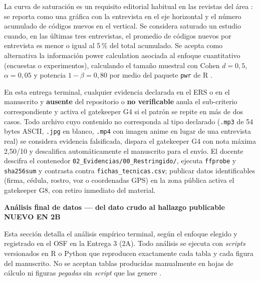 \documentclass[11pt,a4paper]{article}
\newcounter{secc}
\newcommand{\secband}[1]{%
    \stepcounter{secc}\par\vspace{9pt}\noindent
    {\setlength{\fboxsep}{0pt}%
        \colorbox{uteqgold}{\parbox[c][20pt][c]{0.05\textwidth}{\centering\textbf{\color{white}\small \arabic{secc}}}}%
        \colorbox{uteqgreen}{\parbox[c][20pt][c]{0.95\textwidth}{\hspace{8pt}\textbf{\color{white}\small #1}}}%
    }\par\vspace{5pt}}
\newcommand{\bF}{{\setlength{\fboxsep}{1.5pt}\colorbox{crimsonfin}{\scriptsize\bfseries\color{white}NUEVO EN 2B}}}
\begin{document}
\begin{notabox}[title=Sobre el punto de saturación y su reporte editorial]
    La curva de saturación es un requisito editorial habitual en las revistas del área \cite{hennink2017saturation,mendez2017naming}: se reporta como una gráfica con la entrevista en el eje horizontal y el número acumulado de códigos nuevos en el vertical.
    Se considera saturado un estudio cuando, en las últimas tres entrevistas, el promedio de códigos nuevos por entrevista es menor o igual al 5\,\% del total acumulado.
    Se acepta como alternativa la información power calculation asociada al enfoque cuantitativo (encuestas o experimentos), calculando el tamaño muestral con Cohen $d=0{,}5$, $\alpha=0{,}05$ y potencia $1-\beta=0{,}80$ por medio del paquete \texttt{pwr} de R \cite{cohen1988statpwr,champely2020pwr}.
\end{notabox}

\begin{alertbox}[title=Regla estricta de evidencias --- terminal]
    En esta entrega terminal, cualquier evidencia declarada en el ERS o en el manuscrito y \textbf{ausente} del repositorio o \textbf{no verificable} anula el sub-criterio correspondiente y activa el gatekeeper G4 si el patrón se repite en más de dos casos.
    Todo archivo cuyo contenido no corresponda al tipo declarado (\texttt{.mp3} de 54 bytes ASCII, \texttt{.jpg} en blanco, \texttt{.mp4} con imagen anime en lugar de una entrevista real) se considera evidencia falsificada, dispara el gatekeeper G4 con nota máxima 2,50/10 y descalifica automáticamente el manuscrito para el envío.
    El docente descifra el contenedor \texttt{02\_Evidencias/00\_Restringido/}, ejecuta \texttt{ffprobe} y \texttt{sha256sum} y contrasta contra \texttt{fichas\_tecnicas.csv}; publicar datos identificables (firma, cédula, rostro, voz o coordenadas GPS) en la zona pública activa el gatekeeper G8, con retiro inmediato del material.
\end{alertbox}

\secband{Análisis final de datos --- del dato crudo al hallazgo publicable \bF}

Esta sección detalla el análisis empírico terminal, según el enfoque elegido y registrado en el OSF en la Entrega 3 (2A).
Todo análisis se ejecuta con \emph{scripts} versionados en R o Python que reproducen exactamente cada tabla y cada figura del manuscrito.
No se aceptan tablas producidas manualmente en hojas de cálculo ni figuras \emph{pegadas} sin \emph{script} que las genere \cite{sandve2013reproducible,peng2011reproducible}.
\end{document}
